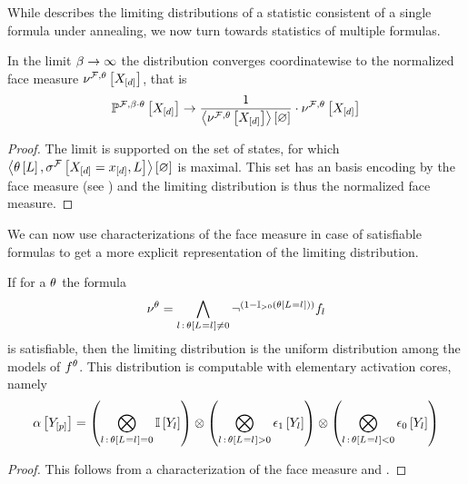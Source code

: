 While  describes the limiting distributions of a statistic consistent of a single formula under annealing, we now turn towards statistics of multiple formulas.

\begin{theorem}\label{the:limitingDistribution}
	In the limit $\beta\rightarrow\infty$ the distribution converges coordinatewise to the normalized face measure $\nu^{\mathcal{F},\theta}\left[X_{[d]}\right]$, that is
	\begin{align*}
		\mathbb{P}^{\mathcal{F},\beta\cdot\theta}\left[X_{[d]}\right] \rightarrow \frac{1}{\left\langle \nu^{\mathcal{F},\theta}\left[X_{[d]}\right]\right\rangle \left[ \varnothing \right]} \cdot \nu^{\mathcal{F},\theta}\left[X_{[d]}\right]
	\end{align*}
\end{theorem}
\begin{proof}
	The limit is supported on the set of states, for which $\left\langle \theta\left[L\right],\sigma^{\mathcal{F}}\left[X_{[d]}=x_{[d]},L\right]\right\rangle \left[ \varnothing \right]$ is maximal.
	This set has an basis encoding by the face measure (see ) and the limiting distribution is thus the normalized face measure.
\end{proof}

We can now use characterizations of the face measure in case of satisfiable formulas to get a more explicit representation of the limiting distribution.

\begin{theorem}
	If for a $\theta$ the formula
	\begin{align*}
		\nu^{\theta}
		= \bigwedge_{l\,:\,\theta\left[L_{}=l_{}\right]\neq0} \lnot^{(1-\mathbb{I}_{>0}\left(\theta\left[L_{}=l_{}\right]\right))} f_{l}
	\end{align*}
	is satisfiable, then the limiting distribution is the uniform distribution among the models of $f^{\theta}$.
	This distribution is computable with elementary activation cores, namely
	\begin{align*}
		\alpha\left[Y_{[p]}\right]
		= \left(\bigotimes_{l\,:\,\theta\left[L_{}=l_{}\right]=0} \mathbb{I}\left[Y_{l}\right]\right)
		\otimes \left(\bigotimes_{l\,:\,\theta\left[L_{}=l_{}\right]>0} \epsilon_1\left[Y_{l}\right]\right)
		\otimes \left(\bigotimes_{l\,:\,\theta\left[L_{}=l_{}\right]<0} \epsilon_0\left[Y_{l}\right]\right)
	\end{align*}
\end{theorem}
\begin{proof}
	This follows from a characterization of the face measure and .
\end{proof}


